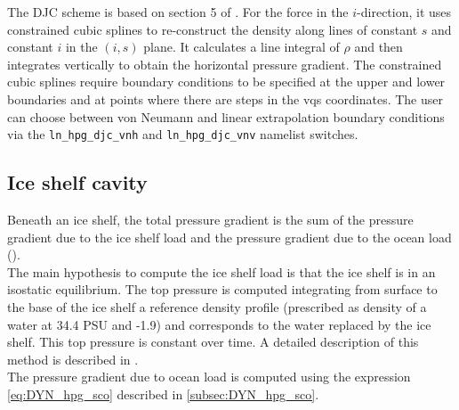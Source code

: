 \documentclass[../main/NEMO_manual]{subfiles}
\begin{document}
The DJC scheme is based on section 5 of \cite{shchepetkin.mcwilliams_OM05}. For the force in the 
$i$-direction, it uses constrained cubic splines to re-construct the density along lines of constant $s$ 
and constant $i$ in the $(i,s)$ plane. It calculates a line integral of $\rho$ and then integrates
vertically to obtain the horizontal pressure gradient. The constrained cubic splines require
boundary conditions to be specified at the upper and lower boundaries and at points where there are steps 
in the vqs coordinates. The user can choose between von Neumann and linear extrapolation boundary conditions
via the \texttt{ln\_hpg\_djc\_vnh} and \texttt{ln\_hpg\_djc\_vnv} namelist switches.              

\subsection{Ice shelf cavity}
\label{subsec:DYN_hpg_isf}

Beneath an ice shelf, the total pressure gradient is the sum of the pressure gradient due to the ice shelf load and
the pressure gradient due to the ocean load ().\\

The main hypothesis to compute the ice shelf load is that the ice shelf is in an isostatic equilibrium.
The top pressure is computed integrating from surface to the base of the ice shelf a reference density profile
(prescribed as density of a water at 34.4 PSU and -1.9) and
corresponds to the water replaced by the ice shelf.
This top pressure is constant over time.
A detailed description of this method is described in \citet{losch_JGR08}.\\

The pressure gradient due to ocean load is computed using the expression \autoref{eq:DYN_hpg_sco} described in
\autoref{subsec:DYN_hpg_sco}.
\end{document}
